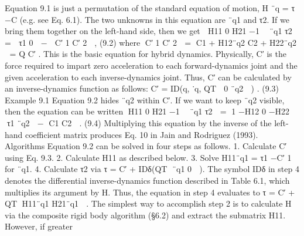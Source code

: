 Equation 9.1 is just a permutation of the standard equation of motion, H ¨q = τ −C (e.g. see Eq. 6.1). The two unknowns in this equation are ¨q1 and τ2. If we bring them together on the left-hand side, then we get  H11 0 H21 −1  ¨q1 τ2  =  τ1 0  −  C′ 1 C′ 2  , (9.2) where C′ 1 C′ 2  = C1 + H12¨q2 C2 + H22¨q2  = Q C′ . This is the basic equation for hybrid dynamics. Physically, C′ is the force required to impart zero acceleration to each forward-dynamics joint and the given acceleration to each inverse-dynamics joint. Thus, C′ can be calculated by an inverse-dynamics function as follows: C′ = ID(q, ˙q, QT  0 ¨q2  ) . (9.3) Example 9.1 Equation 9.2 hides ¨q2 within C′. If we want to keep ¨q2 visible, then the equation can be written H11 0 H21 −1  ¨q1 τ2  = 1 −H12 0 −H22  τ1 ¨q2  − C1 C2  . (9.4) Multiplying this equation by the inverse of the left-hand coefficient matrix produces Eq. 10 in Jain and Rodriguez (1993). Algorithms Equation 9.2 can be solved in four steps as follows. 1. Calculate C′ using Eq. 9.3. 2. Calculate H11 as described below. 3. Solve H11¨q1 = τ1 −C′ 1 for ¨q1. 4. Calculate τ2 via τ = C′ + IDδ(QT ¨q1 0  ). The symbol IDδ in step 4 denotes the differential inverse-dynamics function described in Table 6.1, which multiplies its argument by H. Thus, the equation in step 4 evaluates to τ = C′ + QT H11¨q1 H21¨q1  . The simplest way to accomplish step 2 is to calculate H via the composite rigid body algorithm (§6.2) and extract the submatrix H11. However, if greater

